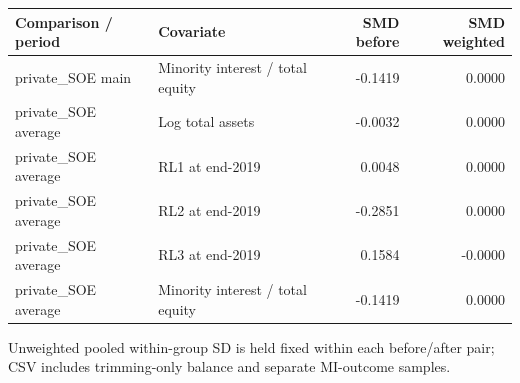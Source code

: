 \par\medskip
\begin{tabular}{lp{4.8cm}rr}
\toprule
Comparison / period & Covariate & SMD before & SMD weighted \\
\midrule
private\_SOE main & \raggedright Minority interest / total equity & -0.1419 & 0.0000 \\
private\_SOE average & \raggedright Log total assets & -0.0032 & 0.0000 \\
private\_SOE average & \raggedright RL1 at end-2019 & 0.0048 & 0.0000 \\
private\_SOE average & \raggedright RL2 at end-2019 & -0.2851 & 0.0000 \\
private\_SOE average & \raggedright RL3 at end-2019 & 0.1584 & -0.0000 \\
private\_SOE average & \raggedright Minority interest / total equity & -0.1419 & 0.0000 \\
\bottomrule
\end{tabular}
\par\medskip
\footnotesize Unweighted pooled within-group SD is held fixed within each before/after pair; CSV includes trimming-only balance and separate MI-outcome samples.
\endgroup
